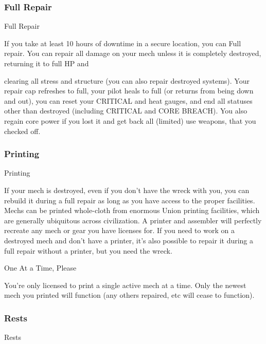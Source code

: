 \subsubsection{Full Repair}
                                                Full Repair  

If you take at least 10 hours of downtime in a secure location, you can Full repair. You can  
repair all damage on your mech unless it is completely destroyed, returning it to full HP and  

                                                                                                                


clearing all stress and structure (you can also repair destroyed systems). Your repair cap  
refreshes to full, your pilot heals to full (or returns from being down and out), you can reset  
your CRITICAL and heat gauges, and end all statuses other than destroyed (including  
CRITICAL and CORE BREACH). You also regain core power if you lost it and get back all  
(limited) use weapons, that you checked off. 
 
\subsubsection{Printing}
                                                   Printing  

If your mech is destroyed, even if you don’t have the wreck with you, you can rebuild it during a  
full repair as long as you have access to the proper facilities. Mechs can be printed whole-cloth  
from enormous Union printing facilities, which are generally ubiquitous across civilization. A  
printer and assembler will perfectly recreate any mech or gear you have licenses for. If you need  
to work on a destroyed mech and don’t have a printer, it’s also possible to repair it during a full  
repair without a printer, but you need the wreck.
 

                                            One At a Time, Please  

You’re only licensed to print a single active mech at a time. Only the newest mech you printed  
will function (any others repaired, etc will cease to function).
 
\subsubsection{Rests}
                                                     Rests  

